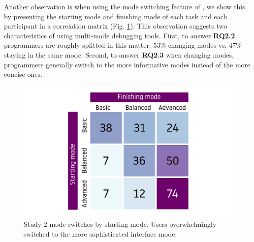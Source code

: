 

Another observation is when using the mode switching feature of \chameleon{}, we show this by presenting the starting mode and finishing mode of each task and each participant in a correlation matrix (Fig. \ref{fig:r4-mode-switching}). This observation suggests two characteristics of using multi-mode debugging tools. First, to answer \textbf{RQ2.2} programmers are roughly splitted in this matter: 53\% changing modes vs. 47\% staying in the same mode. Second, to answer \textbf{RQ2.3} when changing modes, programmers generally switch to the more informative modes instead of the more concise ones.
\begin{figure}
    \centering
    \includegraphics[width=0.7\linewidth,trim=0mm 5mm 0mm 5mm,clip]{images/mode-switching.pdf}
    \caption{Study 2 mode switches by starting mode.  Users overwhelmingly switched to the more sophisticated interface mode.
    }
    \label{fig:r4-mode-switching}
\end{figure}


